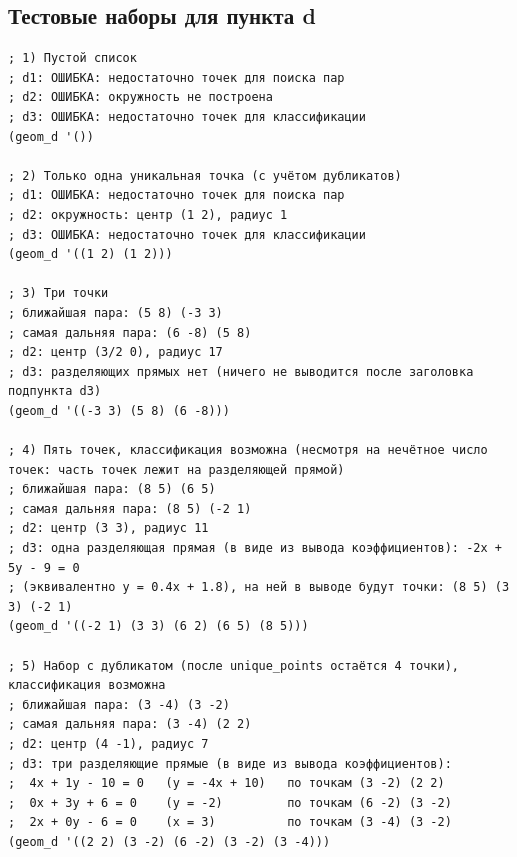 \documentclass[a4paper, 11pt]{article}
\begin{document}
\subsection*{Тестовые наборы для пункта d}
\begin{lstlisting}
; 1) Пустой список
; d1: ОШИБКА: недостаточно точек для поиска пар
; d2: ОШИБКА: окружность не построена
; d3: ОШИБКА: недостаточно точек для классификации
(geom_d '())

; 2) Только одна уникальная точка (с учётом дубликатов)
; d1: ОШИБКА: недостаточно точек для поиска пар
; d2: окружность: центр (1 2), радиус 1
; d3: ОШИБКА: недостаточно точек для классификации
(geom_d '((1 2) (1 2)))

; 3) Три точки
; ближайшая пара: (5 8) (-3 3)
; самая дальняя пара: (6 -8) (5 8)
; d2: центр (3/2 0), радиус 17
; d3: разделяющих прямых нет (ничего не выводится после заголовка подпункта d3)
(geom_d '((-3 3) (5 8) (6 -8)))

; 4) Пять точек, классификация возможна (несмотря на нечётное число точек: часть точек лежит на разделяющей прямой)
; ближайшая пара: (8 5) (6 5)
; самая дальняя пара: (8 5) (-2 1)
; d2: центр (3 3), радиус 11
; d3: одна разделяющая прямая (в виде из вывода коэффициентов): -2x + 5y - 9 = 0
; (эквивалентно y = 0.4x + 1.8), на ней в выводе будут точки: (8 5) (3 3) (-2 1)
(geom_d '((-2 1) (3 3) (6 2) (6 5) (8 5)))

; 5) Набор с дубликатом (после unique_points остаётся 4 точки), классификация возможна
; ближайшая пара: (3 -4) (3 -2)
; самая дальняя пара: (3 -4) (2 2)
; d2: центр (4 -1), радиус 7
; d3: три разделяющие прямые (в виде из вывода коэффициентов):
;  4x + 1y - 10 = 0   (y = -4x + 10)   по точкам (3 -2) (2 2)
;  0x + 3y + 6 = 0    (y = -2)         по точкам (6 -2) (3 -2)
;  2x + 0y - 6 = 0    (x = 3)          по точкам (3 -4) (3 -2)
(geom_d '((2 2) (3 -2) (6 -2) (3 -2) (3 -4)))
\end{lstlisting}
\end{document}
